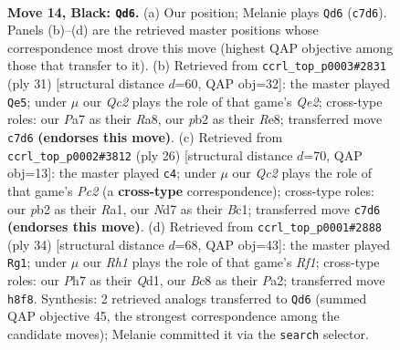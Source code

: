 \documentclass[11pt]{article}
\begin{document}
\clearpage

\begin{figure}[p]\centering
\begin{subfigure}{0.46\textwidth}\centering
\resizebox{\linewidth}{!}{%
\newchessgame
\chessboard[
  setfen={1rb1k2r/ppqn2pp/2p5/3p2p1/3P4/2N1P3/PP2BPPP/2RQ1RK1 b k - 3 14},
  showmover=false,
  pgfstyle=straightmove, color=movearrow, markmove={c7-d6}
]}
\caption{}
\end{subfigure}\hfill
\begin{subfigure}{0.46\textwidth}\centering
\resizebox{\linewidth}{!}{%
\newchessgame
\chessboard[
  setfen={r1b1r1k1/pp2qpp1/2pp1n1p/8/2PN4/3BP2P/PPQ2PP1/3R1RK1 b - - 0 16},
  showmover=false,
  pgfstyle=straightmove, color=movearrow, markmove={e7-e5}
]}
\caption{}
\end{subfigure}
\\[4pt]
\begin{subfigure}{0.46\textwidth}\centering
\resizebox{\linewidth}{!}{%
\newchessgame
\chessboard[
  setfen={r2q1rk1/pp1n1pp1/2pbp1p1/8/3P2P1/5N1P/PPP2PK1/R1BQR3 w - - 4 14},
  showmover=false,
  pgfstyle=straightmove, color=movearrow, markmove={c2-c4}
]}
\caption{}
\end{subfigure}\hfill
\begin{subfigure}{0.46\textwidth}\centering
\resizebox{\linewidth}{!}{%
\newchessgame
\chessboard[
  setfen={r2q1r1k/pp1b3p/2n1p3/1N1p1p1P/1b1P4/3BP3/PP3PNP/R2Q1R1K w - - 6 18},
  showmover=false,
  pgfstyle=straightmove, color=movearrow, markmove={f1-g1}
]}
\caption{}
\end{subfigure}
\caption{\textbf{Move 14, Black: \texttt{Qd6}.} (a) Our position; Melanie plays \texttt{Qd6} (\texttt{c7d6}). Panels (b)--(d) are the retrieved master positions whose correspondence most drove this move (highest QAP objective among those that transfer to it). (b) Retrieved from \texttt{ccrl\_top\_p0003\#2831} (ply 31) [structural distance $d$=60, QAP obj=32]: the master played \texttt{Qe5}; under $\mu$ our \emph{Qc2} plays the role of that game's \emph{Qe2}; cross-type roles: our \emph{P}a7 as their \emph{R}a8, our \emph{p}b2 as their \emph{R}e8; transferred move \texttt{c7d6} \textbf{(endorses this move)}. (c) Retrieved from \texttt{ccrl\_top\_p0002\#3812} (ply 26) [structural distance $d$=70, QAP obj=13]: the master played \texttt{c4}; under $\mu$ our \emph{Qc2} plays the role of that game's \emph{Pc2} (a \textbf{cross-type} correspondence); cross-type roles: our \emph{p}b2 as their \emph{R}a1, our \emph{N}d7 as their \emph{B}c1; transferred move \texttt{c7d6} \textbf{(endorses this move)}. (d) Retrieved from \texttt{ccrl\_top\_p0001\#2888} (ply 34) [structural distance $d$=68, QAP obj=43]: the master played \texttt{Rg1}; under $\mu$ our \emph{Rh1} plays the role of that game's \emph{Rf1}; cross-type roles: our \emph{P}h7 as their \emph{Q}d1, our \emph{B}c8 as their \emph{P}a2; transferred move \texttt{h8f8}. Synthesis: 2 retrieved analogs transferred to \texttt{Qd6} (summed QAP objective 45, the strongest correspondence among the candidate moves); Melanie committed it via the \texttt{search} selector.}
\label{fig:thought-m27}
\end{figure}
\end{document}
